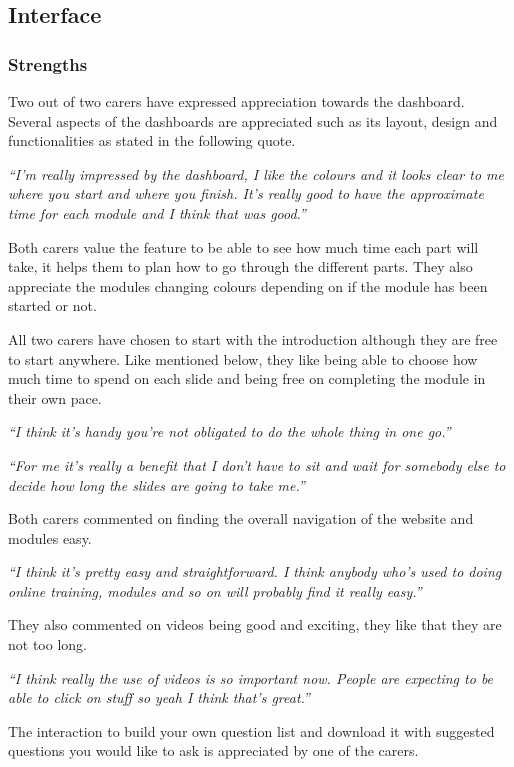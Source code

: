 \documentclass{sigchi}
\begin{document}
\subsection{Interface}
\subsubsection{Strengths}
Two out of two carers have expressed appreciation towards the dashboard. Several aspects of the dashboards are appreciated such as its layout, design and functionalities as stated in the following quote.  

\textit{“I’m really impressed by the dashboard, I like the colours and it looks clear to me where you start and where you finish. It’s really good to have the approximate time for each module and I think that was good.”}

Both carers value the feature to be able to see how much time each part will take, it helps them to plan how to go through the different parts. They also appreciate the modules changing colours depending on if the module has been started or not.

All two carers have chosen to start with the introduction although they are free to start anywhere. Like mentioned below, they like being able to choose how much time to spend on each slide and being free on completing the module in their own pace. 

\textit{“I think it’s handy you’re not obligated to do the whole thing in one go.”} 

\textit{“For me it’s really a benefit that I don't have to sit and wait for somebody else to decide how long the slides are going to take me.”}

Both carers commented on finding the overall navigation of the website and modules easy.

\textit{“I think it’s pretty easy and straightforward. I think anybody who’s used to doing online training, modules and so on will probably find it really easy.”}

They also commented on videos being good and exciting, they like that they are not too long. 

\textit{“I think really the use of videos is so important now. People are expecting to be able to click on stuff so yeah I think that’s great.”}

The interaction to build your own question list and download it with suggested questions you would like to ask is appreciated by one of the carers. 
\end{document}
